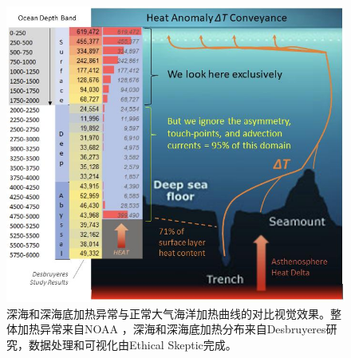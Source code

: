 \documentclass[10pt,twocolumn,letterpaper]{article}
\begin{document}
\begin{figure}[t]
\begin{center}
\includegraphics[width=1\textwidth]{deepsea.jpg}
\end{center}
   \caption{深海和深海底加热异常与正常大气海洋加热曲线的对比视觉效果。整体加热异常来自NOAA \cite{147}，深海和深海底加热分布来自Desbruyeres研究\cite{132}，数据处理和可视化由Ethical Skeptic完成\cite{129}。}
\label{fig:21}
\end{figure}
\end{document}
